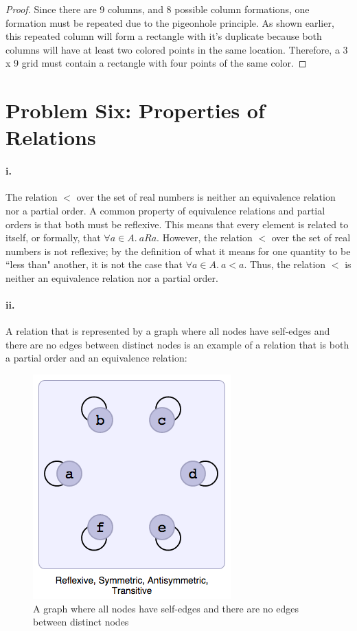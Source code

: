 \documentclass[10pt,letter]{article}
\begin{document}
\begin{proof}
Since there are 9 columns, and 8 possible column formations, one formation must be repeated due to the pigeonhole principle. As shown earlier, this repeated column will form a rectangle with it's duplicate because both columns will have at least two colored points in the same location. Therefore, a 3 x 9 grid must contain a rectangle with four points of the same color. 
\end{proof}

\pagebreak
\section*{Problem Six: Properties of Relations}

\paragraph{i.} The relation $<$ over the set of real numbers is neither an equivalence relation nor a partial order. A common property of equivalence relations and partial orders is that both must be reflexive. This means that every element is related to itself, or formally, that $\forall a \in A.\ aRa$. However, the relation $<$ over the set of real numbers is not reflexive; by the definition of what it means for one quantity to be ``less than" another, it is not the case that $\forall a \in A.\ a<a$. Thus, the relation $<$ is neither an equivalence relation nor a partial order. 

\paragraph{ii.} A relation that is represented by a graph where all nodes have self-edges and there are no edges between distinct nodes is an example of a relation that is both a partial order and an equivalence relation:

\begin{figure}[h]
\centering
  \includegraphics[width=0.45\linewidth]{hw4_6ii.png}
  \caption{A graph where all nodes have self-edges and there are no edges between distinct nodes}
  \label{fig:q6ii}
\end{figure}
\end{document}

